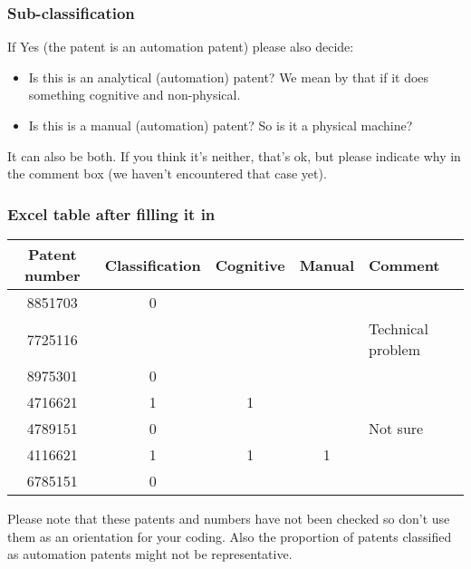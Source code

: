 \documentclass[10pt]{beamer}
\begin{document}
\begin{frame}\frametitle{Sub-classification}
If Yes (the patent is an automation patent) please also decide:
	\begin{itemize}
	\item Is this is an analytical (automation) patent? We mean by that if it does something cognitive and non-physical.
	\item Is this is a manual (automation) patent? So is it a physical machine?
	\end{itemize}
It can also be both. If you think it's neither, that's ok, but please indicate why in the comment box (we haven't encountered that case yet).
\end{frame}


\begin{frame}\frametitle{Excel table after filling it in}
\vspace{-1cm}
\begin{table}
\begin{small}
  \begin{threeparttable}
     \begin{tabular}{ccccl}
        \textbf{Patent number} & \textbf{Classification} & \textbf{Cognitive} & \textbf{Manual} & \textbf{Comment}  \tabularnewline
        \hline
        8851703	& 0  &  &  &	\tabularnewline
        7725116 & 	 &  &  &	Technical problem\tabularnewline
        8975301 & 0	 &  &  &	\tabularnewline
        4716621 & 1	 & 1 &  &	\tabularnewline
        4789151 & 0	 &  &  & 	Not sure\tabularnewline
        4116621 & 1	 & 1 & 1 &	\tabularnewline
        6785151 & 0	 &  &  & 	\tabularnewline
        \hline
     \end{tabular}
  \end{threeparttable}
\end{small}
\end{table}
\vspace{0.5cm}
{\small \textcolor{mytextgrey}{Please note that these patents and numbers have not been checked so don't use them as an orientation for your coding. Also the proportion of patents classified as automation patents might not be representative.} }

\end{frame}
\end{document}
